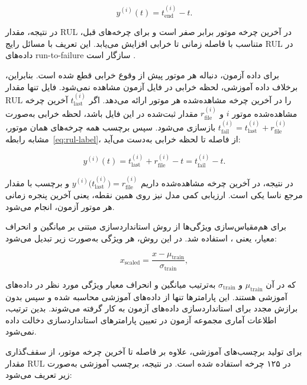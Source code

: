 \begin{equation}
	\label{eq:rul-label}
	y^{(i)}(t)
	=
	t_{\mathrm{end}}^{(i)}-t.
\end{equation}

در نتیجه، مقدار \gls{RUL} در آخرین چرخه موتور برابر صفر است و
برای چرخه‌های قبل، متناسب با فاصله زمانی تا خرابی افزایش می‌یابد.
این تعریف با مسائل رایج 
\gls{RUL}
در داده‌های
\gls{run-to-failure}
 سازگار است \cite{NASA2007C-MAPSS,heimes2008recurrent}.


برای داده آزمون، دنباله هر موتور پیش از وقوع خرابی قطع شده است.
بنابراین، برخلاف داده آموزشی، لحظه خرابی در فایل آزمون مشاهده نمی‌شود.
فایل  تنها مقدار \gls{RUL} را در آخرین چرخه
مشاهده‌شده هر موتور ارائه می‌دهد.
اگر $t_{\mathrm{last}}^{(i)}$ آخرین چرخه مشاهده‌شده موتور $i$
و $r_{\mathrm{file}}^{(i)}$ مقدار ثبت‌شده در این فایل باشد،
لحظه خرابی به‌صورت
$t_{\mathrm{fail}}^{(i)}=t_{\mathrm{last}}^{(i)}+r_{\mathrm{file}}^{(i)}$
بازسازی می‌شود.
سپس برچسب همه چرخه‌های همان موتور، مشابه رابطه~\eqref{eq:rul-label}،
از فاصله تا لحظه خرابی به‌دست می‌آید:

\begin{equation}
	\label{eq:rul-test}
	y^{(i)}(t)
	=
	t_{\mathrm{last}}^{(i)}
	+
	r_{\mathrm{file}}^{(i)}
	-
	t
	=
	t_{\mathrm{fail}}^{(i)}-t.
\end{equation}

در نتیجه، در آخرین چرخه مشاهده‌شده داریم
$y^{(i)}\bigl(t_{\mathrm{last}}^{(i)}\bigr)=r_{\mathrm{file}}^{(i)}$
و برچسب با مقدار مرجع ناسا یکی است.
ارزیابی کمی مدل نیز روی همین نقطه، یعنی آخرین پنجره زمانی هر موتور
آزمون، انجام می‌شود.


برای هم‌مقیاس‌سازی ویژگی‌ها از روش استانداردسازی مبتنی بر
میانگین و انحراف معیار، یعنی ، استفاده شد.
در این روش، هر ویژگی به‌صورت زیر تبدیل می‌شود:

\begin{equation}
	\label{eq:standard-scaling}
	x_{\mathrm{scaled}}
	=
	\frac{x-\mu_{\mathrm{train}}}
	{\sigma_{\mathrm{train}}},
\end{equation}

که در آن $\mu_{\mathrm{train}}$ و $\sigma_{\mathrm{train}}$
به‌ترتیب میانگین و انحراف معیار ویژگی مورد نظر در داده‌های
آموزشی هستند. این پارامترها تنها از داده‌های آموزشی محاسبه
شده و سپس بدون برازش مجدد برای استانداردسازی داده‌های آزمون
به کار گرفته می‌شوند. بدین ترتیب، اطلاعات آماری مجموعه آزمون
در تعیین پارامترهای استانداردسازی دخالت داده نمی‌شود.

برای تولید برچسب‌های آموزشی، علاوه بر فاصله تا آخرین چرخه
موتور، از سقف‌گذاری مقدار \gls{RUL} در ۱۲۵ چرخه استفاده شده
است. در نتیجه، برچسب آموزشی به‌صورت زیر تعریف می‌شود:

